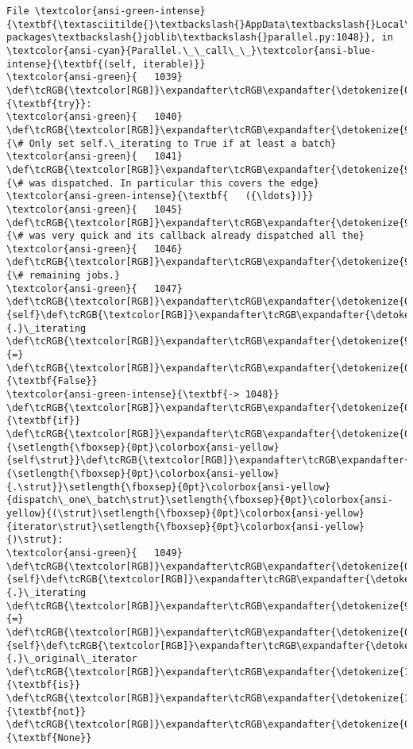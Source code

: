 \documentclass[11pt]{article}
\begin{document}
\begin{Verbatim}[commandchars=\\\{\}, frame=single, framerule=2mm, rulecolor=\color{outerrorbackground}]
File \textcolor{ansi-green-intense}{\textbf{\textasciitilde{}\textbackslash{}AppData\textbackslash{}Local\textbackslash{}anaconda3\textbackslash{}lib\textbackslash{}site-packages\textbackslash{}joblib\textbackslash{}parallel.py:1048}}, in \textcolor{ansi-cyan}{Parallel.\_\_call\_\_}\textcolor{ansi-blue-intense}{\textbf{(self, iterable)}}
\textcolor{ansi-green}{   1039} \def\tcRGB{\textcolor[RGB]}\expandafter\tcRGB\expandafter{\detokenize{0,135,0}}{\textbf{try}}:
\textcolor{ansi-green}{   1040}     \def\tcRGB{\textcolor[RGB]}\expandafter\tcRGB\expandafter{\detokenize{95,135,135}}{\# Only set self.\_iterating to True if at least a batch}
\textcolor{ansi-green}{   1041}     \def\tcRGB{\textcolor[RGB]}\expandafter\tcRGB\expandafter{\detokenize{95,135,135}}{\# was dispatched. In particular this covers the edge}
\textcolor{ansi-green-intense}{\textbf{   ({\ldots})}}
\textcolor{ansi-green}{   1045}     \def\tcRGB{\textcolor[RGB]}\expandafter\tcRGB\expandafter{\detokenize{95,135,135}}{\# was very quick and its callback already dispatched all the}
\textcolor{ansi-green}{   1046}     \def\tcRGB{\textcolor[RGB]}\expandafter\tcRGB\expandafter{\detokenize{95,135,135}}{\# remaining jobs.}
\textcolor{ansi-green}{   1047}     \def\tcRGB{\textcolor[RGB]}\expandafter\tcRGB\expandafter{\detokenize{0,135,0}}{self}\def\tcRGB{\textcolor[RGB]}\expandafter\tcRGB\expandafter{\detokenize{98,98,98}}{.}\_iterating \def\tcRGB{\textcolor[RGB]}\expandafter\tcRGB\expandafter{\detokenize{98,98,98}}{=} \def\tcRGB{\textcolor[RGB]}\expandafter\tcRGB\expandafter{\detokenize{0,135,0}}{\textbf{False}}
\textcolor{ansi-green-intense}{\textbf{-> 1048}}     \def\tcRGB{\textcolor[RGB]}\expandafter\tcRGB\expandafter{\detokenize{0,135,0}}{\textbf{if}} \def\tcRGB{\textcolor[RGB]}\expandafter\tcRGB\expandafter{\detokenize{0,135,0}}{\setlength{\fboxsep}{0pt}\colorbox{ansi-yellow}{self\strut}}\def\tcRGB{\textcolor[RGB]}\expandafter\tcRGB\expandafter{\detokenize{98,98,98}}{\setlength{\fboxsep}{0pt}\colorbox{ansi-yellow}{.\strut}}\setlength{\fboxsep}{0pt}\colorbox{ansi-yellow}{dispatch\_one\_batch\strut}\setlength{\fboxsep}{0pt}\colorbox{ansi-yellow}{(\strut}\setlength{\fboxsep}{0pt}\colorbox{ansi-yellow}{iterator\strut}\setlength{\fboxsep}{0pt}\colorbox{ansi-yellow}{)\strut}:
\textcolor{ansi-green}{   1049}         \def\tcRGB{\textcolor[RGB]}\expandafter\tcRGB\expandafter{\detokenize{0,135,0}}{self}\def\tcRGB{\textcolor[RGB]}\expandafter\tcRGB\expandafter{\detokenize{98,98,98}}{.}\_iterating \def\tcRGB{\textcolor[RGB]}\expandafter\tcRGB\expandafter{\detokenize{98,98,98}}{=} \def\tcRGB{\textcolor[RGB]}\expandafter\tcRGB\expandafter{\detokenize{0,135,0}}{self}\def\tcRGB{\textcolor[RGB]}\expandafter\tcRGB\expandafter{\detokenize{98,98,98}}{.}\_original\_iterator \def\tcRGB{\textcolor[RGB]}\expandafter\tcRGB\expandafter{\detokenize{175,0,255}}{\textbf{is}} \def\tcRGB{\textcolor[RGB]}\expandafter\tcRGB\expandafter{\detokenize{175,0,255}}{\textbf{not}} \def\tcRGB{\textcolor[RGB]}\expandafter\tcRGB\expandafter{\detokenize{0,135,0}}{\textbf{None}}

\end{Verbatim}
\end{document}
